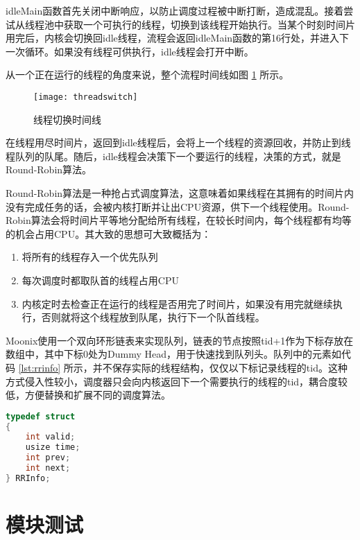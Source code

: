 idleMain函数首先关闭中断响应，以防止调度过程被中断打断，造成混乱。接着尝试从线程池中获取一个可执行的线程，切换到该线程开始执行。当某个时刻时间片用完后，内核会切换回idle线程，流程会返回idleMain函数的第16行处，并进入下一次循环。如果没有线程可供执行，idle线程会打开中断。

从一个正在运行的线程的角度来说，整个流程时间线如图 \ref{pic:threadswitch} 所示。

\begin{figure}[htpb]
	\centering
	\texttt{[image: threadswitch]}
	\setlength{\abovecaptionskip}{2pt}
	\caption{线程切换时间线}
	\label{pic:threadswitch}
\end{figure}

在线程用尽时间片，返回到idle线程后，会将上一个线程的资源回收，并防止到线程队列的队尾。随后，idle线程会决策下一个要运行的线程，决策的方式，就是Round-Robin算法。

Round-Robin算法是一种抢占式调度算法，这意味着如果线程在其拥有的时间片内没有完成任务的话，会被内核打断并让出CPU资源，供下一个线程使用。Round-Robin算法会将时间片平等地分配给所有线程，在较长时间内，每个线程都有均等的机会占用CPU。其大致的思想可大致概括为：

\begin{enumerate}
	\item 将所有的线程存入一个优先队列
	\item 每次调度时都取队首的线程占用CPU
	\item 内核定时去检查正在运行的线程是否用完了时间片，如果没有用完就继续执行，否则就将这个线程放到队尾，执行下一个队首线程。
\end{enumerate}

Moonix使用一个双向环形链表来实现队列，链表的节点按照tid+1作为下标存放在数组中，其中下标0处为Dummy Head，用于快速找到队列头。队列中的元素如代码 \ref{lst:rrinfo} 所示，并不保存实际的线程结构，仅仅以下标记录线程的tid。这种方式侵入性较小，调度器只会向内核返回下一个需要执行的线程的tid，耦合度较低，方便替换和扩展不同的调度算法。

\begin{minipage}[c]{0.95\textwidth}
\begin{lstlisting}[language={C}, caption={线程调度器元素}, label={lst:rrinfo}]
typedef struct
{
	int valid;
	usize time;
	int prev;
	int next;
} RRInfo;
\end{lstlisting}
\end{minipage}

\section{模块测试}

